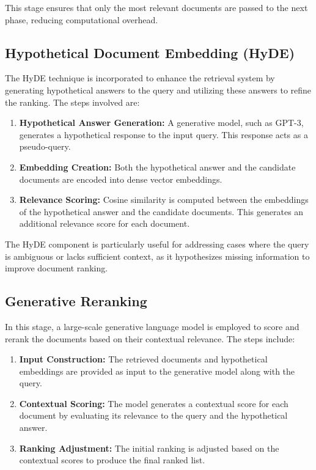 This stage ensures that only the most relevant documents are passed to the next phase, reducing computational overhead.

\subsection{Hypothetical Document Embedding (HyDE)}
The HyDE technique is incorporated to enhance the retrieval system by generating hypothetical answers to the query and utilizing these answers to refine the ranking. The steps involved are:
\begin{enumerate}
    \item \textbf{Hypothetical Answer Generation:} A generative model, such as GPT-3, generates a hypothetical response to the input query. This response acts as a pseudo-query.
    \item \textbf{Embedding Creation:} Both the hypothetical answer and the candidate documents are encoded into dense vector embeddings.
    \item \textbf{Relevance Scoring:} Cosine similarity is computed between the embeddings of the hypothetical answer and the candidate documents. This generates an additional relevance score for each document.
\end{enumerate}

The HyDE component is particularly useful for addressing cases where the query is ambiguous or lacks sufficient context, as it hypothesizes missing information to improve document ranking.

\subsection{Generative Reranking}
In this stage, a large-scale generative language model is employed to score and rerank the documents based on their contextual relevance. The steps include:
\begin{enumerate}
    \item \textbf{Input Construction:} The retrieved documents and hypothetical embeddings are provided as input to the generative model along with the query.
    \item \textbf{Contextual Scoring:} The model generates a contextual score for each document by evaluating its relevance to the query and the hypothetical answer.
    \item \textbf{Ranking Adjustment:} The initial ranking is adjusted based on the contextual scores to produce the final ranked list.
\end{enumerate}

